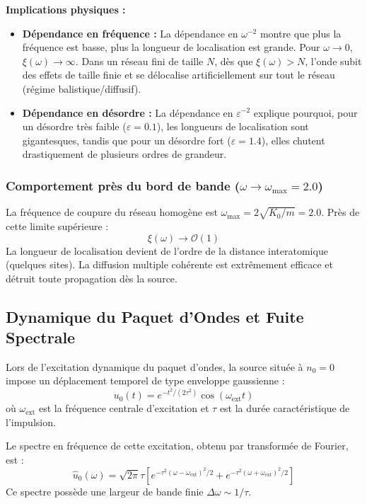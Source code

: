 \documentclass[11pt,a4paper]{article}
\begin{document}
\textbf{Implications physiques :}
\begin{itemize}
    \item \textbf{Dépendance en fréquence :} La dépendance en $\omega^{-2}$ montre que plus la fréquence est basse, plus la longueur de localisation est grande. Pour $\omega \to 0$, $\xi(\omega) \to \infty$. Dans un réseau fini de taille $N$, dès que $\xi(\omega) > N$, l'onde subit des effets de taille finie et se délocalise artificiellement sur tout le réseau (régime balistique/diffusif).
    \item \textbf{Dépendance en désordre :} La dépendance en $\varepsilon^{-2}$ explique pourquoi, pour un désordre très faible ($\varepsilon = 0.1$), les longueurs de localisation sont gigantesques, tandis que pour un désordre fort ($\varepsilon = 1.4$), elles chutent drastiquement de plusieurs ordres de grandeur.
\end{itemize}

\subsubsection{Comportement près du bord de bande ($\omega \to \omega_{\text{max}} = 2.0$)}
La fréquence de coupure du réseau homogène est $\omega_{\text{max}} = 2\sqrt{K_0/m} = 2.0$. Près de cette limite supérieure :
\begin{equation}
    \xi(\omega) \to \mathcal{O}(1)
\end{equation}
La longueur de localisation devient de l'ordre de la distance interatomique (quelques sites). La diffusion multiple cohérente est extrêmement efficace et détruit toute propagation dès la source.

\subsection{Dynamique du Paquet d'Ondes et Fuite Spectrale}
Lors de l'excitation dynamique du paquet d'ondes, la source située à $n_0=0$ impose un déplacement temporel de type enveloppe gaussienne :
\begin{equation}
    u_0(t) = e^{-t^2 / (2\tau^2)} \cos(\omega_{\text{ext}} t)
\end{equation}
où $\omega_{\text{ext}}$ est la fréquence centrale d'excitation et $\tau$ est la durée caractéristique de l'impulsion.

Le spectre en fréquence de cette excitation, obtenu par transformée de Fourier, est :
\begin{equation}
    \hat{u}_0(\omega) = \sqrt{2\pi}\tau \left[ e^{-\tau^2(\omega - \omega_{\text{ext}})^2/2} + e^{-\tau^2(\omega + \omega_{\text{ext}})^2/2} \right]
\end{equation}
Ce spectre possède une largeur de bande finie $\Delta \omega \sim 1/\tau$. 
\end{document}
